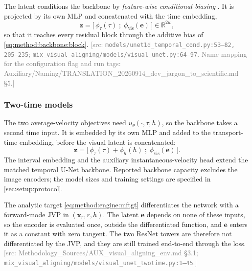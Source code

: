 \documentclass[headsepline,footsepline,footinclude=false,oneside,fontsize=11pt,paper=a4,listof=totoc,bibliography=totoc]{scrbook}
\theoremstyle{definition}
\theoremstyle{plain}
\theoremstyle{remark}
\newcommand{\vect}[1]{\boldsymbol{#1}}
\newcommand{\sidx}[1]{_{\textrm{#1}}}
\newcommand{\R}{\mathbb{R}}                    %
\newcommand{\afield}{u}                        %
\newcommand{\ftime}{\tau}                      %
\newif\ifsubmission
\newcommand{\srcnote}[1]{\ifsubmission\else\textcolor{gray}{\footnotesize\textsf{[src: #1]}}\fi}
\begin{document}
The latent conditions the backbone by \emph{feature-wise conditional biasing}
\parencite[Sec.~3]{perez2017film}. It is projected by its own MLP and concatenated with the time
embedding,
\begin{equation}\label{eq:method:backbone:concat}
  \vect{z} = \big[\,\phi_{\ftime}(\ftime)\;;\;\phi\sidx{vis}(\vect{e})\,\big] \in \R^{2w},
\end{equation}
so that it reaches every residual block through the additive bias of
\eqref{eq:method:backbone:block}.
\srcnote{\texttt{models/unet1d\_temporal\_cond.py:53--82, 205--235};
\texttt{mix\_visual\_aligning/models/visual\_unet.py:64--97}. Name mapping for the configuration flag
and run tags: Auxiliary/Naming/TRANSLATION\_20260914\_dev\_jargon\_to\_scientific.md \S5.}

\subsubsection*{Two-time models}

The two average-velocity objectives need $\afield_{\theta}(\cdot,\ftime,h)$, so the backbone takes a
second time input. It is embedded by its own MLP and added to the transport-time embedding, before
the visual latent is concatenated:
\begin{equation}\label{eq:method:backbone:twotime}
  \vect{z} = \big[\,\phi_{\ftime}(\ftime) + \phi_{h}(h)\;;\;\phi\sidx{vis}(\vect{e})\,\big].
\end{equation}
The interval embedding and the auxiliary instantaneous-velocity head extend the matched temporal
U-Net backbone. Reported backbone capacity excludes the image encoders; the model sizes and training
settings are specified in \autoref{sec:setup:protocol}.

The analytic target \eqref{eq:method:engine:mftgt} differentiates the network with a forward-mode
\ac{JVP} in $(\vect{x}_{r},r,h)$. The latent $\vect{e}$ depends on none of these inputs, so the encoder
is evaluated once, outside the differentiated function, and $\vect{e}$ enters it as a constant with
zero tangent. The two ResNet towers are therefore not differentiated by the \ac{JVP}, and they are
still trained end-to-end through the loss.
\srcnote{Methodology\_Sources/AUX\_visual\_aligning\_env.md \S3.1;
\texttt{mix\_visual\_aligning/models/visual\_unet\_twotime.py:1--45}.}

\end{document}
